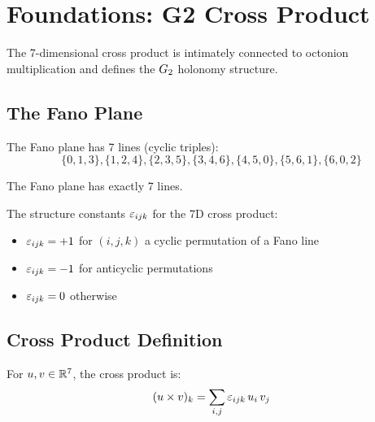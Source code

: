 \chapter{Foundations: G2 Cross Product}\label{chap:g2}

The 7-dimensional cross product is intimately connected to octonion multiplication
and defines the $G_2$ holonomy structure.

\section{The Fano Plane}

\begin{definition}\label{def:fano_lines}
    \leanok
    The Fano plane has 7 lines (cyclic triples):
    \[
        \{0,1,3\}, \{1,2,4\}, \{2,3,5\}, \{3,4,6\}, \{4,5,0\}, \{5,6,1\}, \{6,0,2\}
    \]
\end{definition}

\begin{theorem}\label{thm:fano_lines_count}
    \leanok
    The Fano plane has exactly 7 lines.
\end{theorem}

\begin{definition}\label{def:epsilon}
    \leanok
    The structure constants $\varepsilon_{ijk}$ for the 7D cross product:
    \begin{itemize}
        \item $\varepsilon_{ijk} = +1$ for $(i,j,k)$ a cyclic permutation of a Fano line
        \item $\varepsilon_{ijk} = -1$ for anticyclic permutations
        \item $\varepsilon_{ijk} = 0$ otherwise
    \end{itemize}
\end{definition}

\section{Cross Product Definition}

\begin{definition}\label{def:cross}
    \leanok
    For $u, v \in \mathbb{R}^7$, the cross product is:
    \[
        (u \times v)_k = \sum_{i,j} \varepsilon_{ijk} \, u_i \, v_j
    \]
\end{definition}

